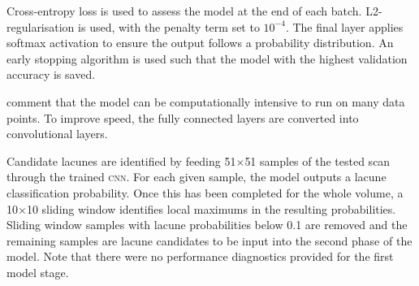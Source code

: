 Cross-entropy loss is used to assess the model at the end of each batch. L2-regularisation is used, with the penalty term set to $10^{-4}$. The final layer applies softmax activation to ensure the output follows a probability distribution. An early stopping algorithm is used such that the model with the highest validation accuracy is saved.

\cite{GhafoorianM.2017Dml3} comment that the model can be computationally intensive to run on many data points. To improve speed, the fully connected layers are converted into convolutional layers.

Candidate lacunes are identified by feeding 51$\times$51 samples of the tested scan through the trained \textsc{cnn}. For each given sample, the model outputs a lacune classification probability. Once this has been completed for the whole volume, a 10$\times$10 sliding window identifies local maximums in the resulting probabilities. Sliding window samples with lacune probabilities below 0.1 are removed and the remaining samples are lacune candidates to be input into the second phase of the model. Note that there were no performance diagnostics provided for the first model stage.

%
%
%
%
%
%
%
%
%
%
%
%
%
%
%
%
%
%
%

